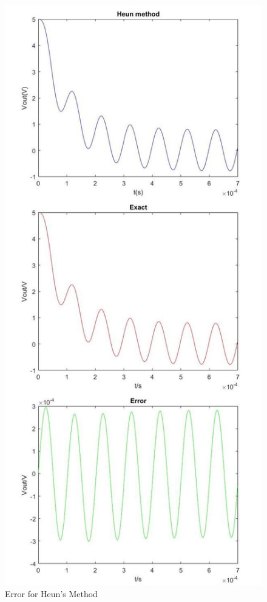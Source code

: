 \documentclass[11pt, oneside, titlepage]{article}   	%
\begin{document}
\begin{figure}[H]
\center
\includegraphics[scale = 0.35]{exercise2_1}
\caption{Error for Heun's Method} \label{fig:ex2_1}
\end{figure}
\end{document}
